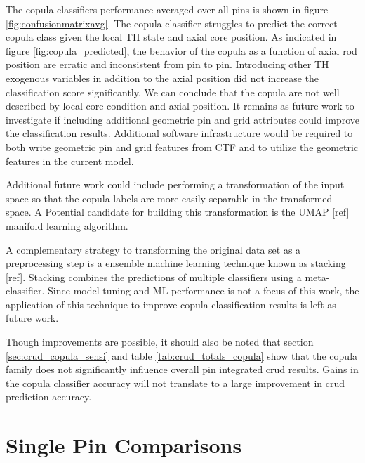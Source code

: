 The copula classifiers performance averaged over all pins is shown in figure \ref{fig:confusionmatrixavg}. The copula classifier struggles to predict the correct copula class given the local TH state and axial core position.  As indicated in figure \ref{fig:copula_predicted}, the behavior of the copula as a function of axial rod position are erratic and inconsistent from pin to pin.  Introducing other TH exogenous variables in addition to the axial position did not increase the classification score significantly.  We can conclude that the copula are not well described by local core condition and axial position.  It remains as future work to investigate if including additional geometric pin and grid attributes could improve the classification results.  Additional software infrastructure would be required to both write geometric pin and grid features from CTF and to utilize the geometric features in the current model.

Additional future work could include performing a transformation of the input space so that the copula labels are more easily separable in the transformed space.  A Potential candidate for building this transformation is the UMAP [ref] manifold learning algorithm.

A complementary strategy to transforming the original data set as a preprocessing step is a ensemble machine learning technique known as stacking [ref].  Stacking combines the predictions of multiple classifiers using a meta-classifier.  Since model tuning and ML performance is not a focus of this work, the application of this technique to improve copula classification results is left as future work.

Though improvements are possible, it should also be noted that section \ref{sec:crud_copula_sensi} and table \ref{tab:crud_totals_copula} show that the copula family does not significantly influence overall pin integrated crud results.  Gains in the copula classifier accuracy will not translate to a large improvement in crud prediction accuracy.

\section{Single Pin Comparisons}

